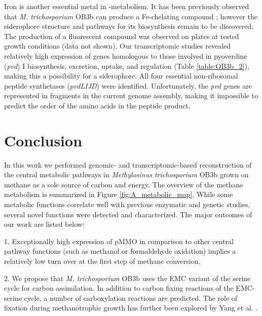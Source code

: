 Iron is another essential metal in -metabolism.
It has been previously observed that \textit{M. trichosporium} OB3b can produce a Fe-chelating compound \cite{yoon2010}; however the siderophore structure and pathways for its biosynthesis remain to be discovered.
The production of a fluorescent compound was observed on plates at tested growth conditions (data not shown).
Our transcriptomic studies revealed relatively high expression of genes homologous to those involved in pyoverdine (\textit{pvd}) I biosynthesis, excretion, uptake, and regulation (Table \ref{table:OB3b_2}), making this a possibility for a siderophore.
All four essential non-ribosomal peptide synthetases (\textit{pvdLIJD}) were identified.
Unfortunately, the \textit{pvd} genes are represented in fragments in the current genome assembly, making it impossible to predict the order of the amino acids in the peptide product.

\section{Conclusion}

In this work we performed genomic- and transcriptomic-based reconstruction of the central metabolic pathways in \textit{Methylosinus trichosporium} OB3b grown on methane as a sole source of carbon and energy.
The overview of the methane metabolism is summarized in Figure \ref{fig:A_metabolic_map}.
While some metabolic functions correlate well with previous enzymatic and genetic studies, several novel functions were detected and characterized.
The major outcomes of our work are listed below:

1. Exceptionally high expression of pMMO in comparison to other central pathway functions (such as methanol or formaldehyde oxidation) implies a relatively low turn over at the first step of methane conversion.

2. We propose that \textit{M. trichosporium} OB3b uses the EMC variant of the serine cycle for carbon assimilation.
In addition to carbon fixing reactions of the EMC-serine cycle, a number of carboxylation reactions are predicted.
The role of  fixation during methanotrophic growth has further been explored by Yang et al. \cite{yangOB3b}.


